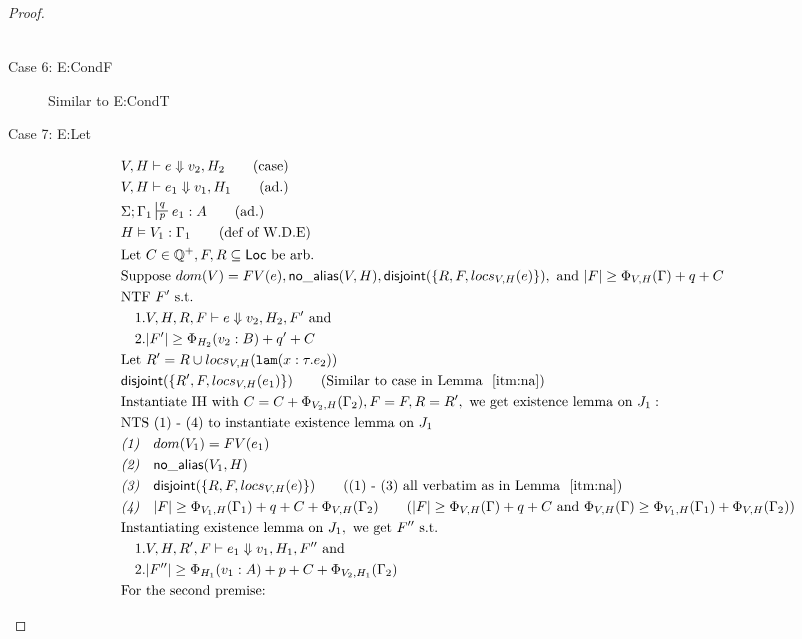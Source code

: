 \documentclass[11pt]{article}
\newcommand{\ms}[1]{\ensuremath{\mathsf{#1}}}
\newcommand{\irl}[1]{\mathtt{#1}}
\newcommand{\na}[1]{\mathsf{no\_alias}(#1)}
\newcommand{\dist}[1]{\mathsf{disjoint}(#1)}
\theoremstyle{definition}
\begin{document}
\begin{proof}
\begin{description}
\begin{align*}
  \end{align*}
  \item[Case 6: E:CondF] 
  Similar to E:CondT
  \item[Case 7: E:Let]
  \begin{align*}
  &V,H \vdash e \Downarrow v_2,H_2 \tag{case}\\
  &V,H \vdash e_1 \Downarrow v_1,H_1 \tag{ad.}\\
  &\Sigma; \Gamma_1 \sststile{p}{q} e_1 : A \tag{ad.}\\
  &H \vDash V_1 : \Gamma_1 \tag{def of W.D.E}\\
  &\text{Let } C \in \mathbb{Q}^+, F,R \subseteq \ms{Loc} \text{ be arb.}\\
  &\text{Suppose }  dom(V) = FV(e),\na{V,H}, \dist{\{R,F,locs_{V,H}(e)\}}, \text{ and } |F| \ge \Phi_{V,H}(\Gamma) + q + C\\
  &\text{NTF } F' \text{ s.t. }\\
  &\quad 1. V,H,R,F \vdash e \Downarrow v_2, H_2,F' \text{ and }\\ 
  &\quad 2. |F'| \ge \Phi_{H_2}(v_2:B) + q' + C\\
  &\text{Let } R' = R \cup locs_{V,H}(\irl{lam}(x : \tau.e_2))\\
  &\dist{\{R',F,locs_{V,H}(e_1)\}} \tag{Similar to case in Lemma $~\ref{itm:na}$}\\
  &\text{Instantiate IH with } C = C + \Phi_{V_2,H}(\Gamma_2), F = F, R = R', \text{ we get existence lemma on } J_1:\\
  &\text{NTS (1) - (4) to instantiate existence lemma on } J_1\\
  &\emph{(1)} \quad dom(V_1) = FV(e_1)\\
  &\emph{(2)} \quad \na{V_1,H}\\
  &\emph{(3)} \quad \dist{\{R,F,locs_{V,H}(e)\}} \tag{(1) - (3) all verbatim as in Lemma $~\ref{itm:na}$}\\
  &\emph{(4)} \quad |F| \ge \Phi_{V_1,H}(\Gamma_1) + q + C + \Phi_{V,H}(\Gamma_2) \tag{$|F| \ge \Phi_{V,H}(\Gamma) + q + C$ and $\Phi_{V,H}(\Gamma) \ge \Phi_{V_1,H}(\Gamma_1) + \Phi_{V,H}(\Gamma_2)$}\\
  &\text{Instantiating existence lemma on } J_1, \text{ we get }  F'' \text{ s.t. }\\
  &\quad 1. V,H,R',F \vdash e_1 \Downarrow v_1, H_1,F'' \text{ and }\\ 
  &\quad 2. |F''| \ge \Phi_{H_1}(v_1:A) + p + C + \Phi_{V_2,H_1}(\Gamma_2)\\
  &\text{For the second premise: }\\

\end{align*}
\end{description}
\end{proof}
\end{document}
